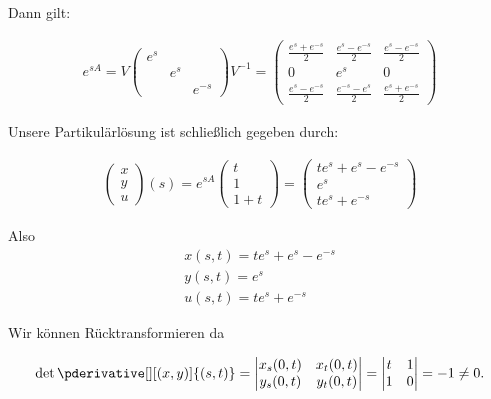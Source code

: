 \begin{solution}
Dann gilt:

\begin{align*}
  e^{sA} = V
  \left(
  \begin{array}{ccc}
  e^s & & \\
  & e^s & \\
  & & e^{-s}
  \end{array}
  \right) V^{-1}
  =
  \left(
  \begin{array}{ccc}
    \frac{e^s + e^{-s}}{2} & \frac{e^s - e^{-s}}{2} & \frac{e^s - e^{-s}}{2} \\
    0 & e^s & 0 \\
    \frac{e^s - e^{-s}}{2} & \frac{e^{-s}-e^s}{2} & \frac{e^s + e^{-s}}{2}
  \end{array}
  \right)
\end{align*}

Unsere Partikulärlösung ist schließlich gegeben durch:

\begin{align*}
\left(
\begin{array}{c}
  x \\
  y \\
  u
\end{array}
\right)(s)
=
e^{sA} \left(
\begin{array}{c}
  t \\
  1 \\
  1+t
\end{array}
\right)
=
\left(
\begin{array}{c}
  te^s + e^s - e^{-s} \\
  e^s \\
  te^s +e^{-s}
\end{array}
\right)
\end{align*}

Also
\begin{align*}
  x(s,t) = te^s + e^s - e^{-s} \\
  y(s,t) = e^s \\
  u(s,t) =   te^s +e^{-s}
\end{align*}

Wir können Rücktransformieren da

\begin{align*}
    \det \pderivative[][(x, y)]{(s, t)}
    =
    \begin{vmatrix}
        x_s(0,t) & x_t(0,t) \\
        y_s(0,t) & y_t(0,t)
    \end{vmatrix}
    =
    \begin{vmatrix}
        t & 1 \\
        1 & 0
    \end{vmatrix}
    =
    -1 \neq 0.
\end{align*}


\end{solution}
